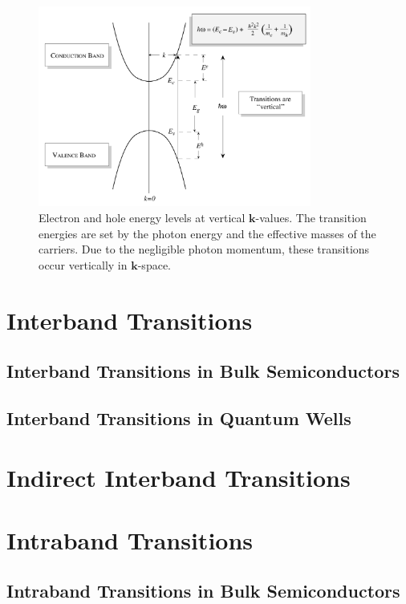 \begin{figure}[H]
    \centering
    \includegraphics[width=0.8\textwidth]{img/transitions.png}
    \caption{Electron and hole energy levels at vertical \(\mathbf{k}\)-values. The transition energies are set by the photon energy and the effective masses of the carriers. Due to the negligible photon momentum, these transitions occur vertically in \(\mathbf{k}\)-space.
    }
    \label{fig:transitions}
\end{figure}



\section{Interband Transitions}

\subsection{Interband Transitions in Bulk Semiconductors}
\subsection{Interband Transitions in Quantum Wells}



\section{Indirect Interband Transitions}


\section{Intraband Transitions}
\subsection{Intraband Transitions in Bulk Semiconductors}
